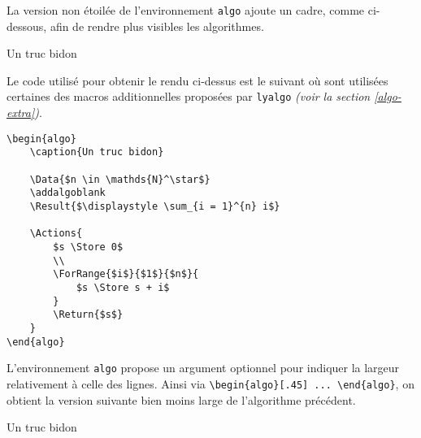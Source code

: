 La version non étoilée de l'environnement \verb+algo+ ajoute un cadre, comme ci-dessous, afin de rendre plus visibles les algorithmes.

\begin{algo}
    \caption{Un truc bidon}

    \addalgoblank

\end{algo} 


\medskip


Le code utilisé pour obtenir le rendu ci-dessus est le suivant où sont utilisées certaines des macros additionnelles proposées par \verb+lyalgo+ \emph{(voir la section \ref{algo-extra})}.

\begin{frame-gene}
    \small
    \begin{verbatim}
\begin{algo}
    \caption{Un truc bidon}

    \Data{$n \in \mathds{N}^\star$}
    \addalgoblank
    \Result{$\displaystyle \sum_{i = 1}^{n} i$}

    \Actions{
        $s \Store 0$
        \\
        \ForRange{$i$}{$1$}{$n$}{
            $s \Store s + i$
        }
        \Return{$s$}
    }
\end{algo}
	\end{verbatim}
\end{frame-gene}


\medskip


L'environnement \verb+algo+ propose un argument optionnel pour indiquer la largeur relativement à celle des lignes.
Ainsi  via \verb+\begin{algo}[.45] ... \end{algo}+, on obtient la version suivante bien moins large de l'algorithme précédent.

\begin{algo}[.45]
    \caption{Un truc bidon}

    \addalgoblank

\end{algo} 


